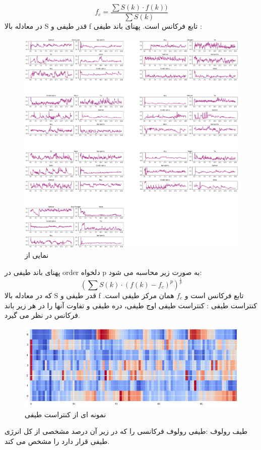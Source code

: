 \documentclass{article}
\begin{document}
\begin{equation}
	f_{c}=\dfrac{\sum S(k)\cdot f(k))}{\sum S(k)}
\end{equation}
در معادله بالا S قدر طیفی و f تابع فرکانس است.\newline
پهنای باند طیفی  : 
\newline
\begin{figure}
	\centering
	\includegraphics[width=0.5\linewidth]{Photo/31}
	\caption[نمایی از ]{نمایی از }
	\label{fig:31}
\end{figure}

پهنای باند طیفی در order دلخواه p به صورت زیر محاسبه می شود:
\begin{equation}
	(\sum S(k)\cdot (f(k)-f_{c})^{p})^{\frac{1}{p}}
\end{equation}
که در معادله بالا S قدر طیفی و f تابع فرکانس است و $f_{c}$ همان مرکز طیفی است.\newline
کنتراست طیفی  :
کنتراست طیفی اوج طیفی، دره طیفی و تفاوت آنها را در هر زیر باند فرکانس در نظر می گیرد.
\begin{figure}[h]
	\centering
	\includegraphics[width=0.7\linewidth]{Photo/8}
	\caption[نمونه ای از کنتراست طیفی]{نمونه ای از کنتراست طیفی}
	\label{fig:8}
\end{figure}
\newpage
طیف رولوف  :طیفی رولوف فرکانسی را که در زیر آن درصد مشخصی از کل انرژی طیفی قرار دارد را مشخص می کند.\newline
\end{document}
